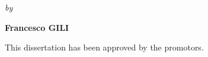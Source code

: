 \begin{titlepage}
\begin{center}
        \bigskip
        \bigskip

        \textit{by}

        \bigskip
        \bigskip

        \makeatletter
        {\Large\bfseries Francesco  \MakeUppercase{Gili}}
        \makeatother



        \vspace*{2\bigskipamount}

    \end{center}

    \clearpage
    \thispagestyle{empty}

    \noindent This dissertation has been approved by the promotors.


\end{titlepage}
